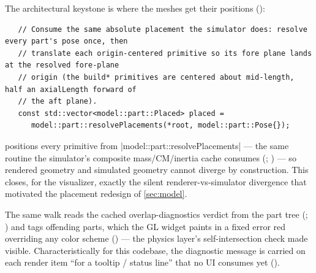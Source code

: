 The architectural keystone is where the meshes get their positions
():

\begin{verbatim}
   // Consume the same absolute placement the simulator does: resolve every part's pose once, then
   // translate each origin-centered primitive so its fore plane lands at the resolved fore-plane
   // origin (the build* primitives are centered about mid-length, half an axialLength forward of
   // the aft plane).
   const std::vector<model::part::Placed> placed =
      model::part::resolvePlacements(*root, model::part::Pose{});
\end{verbatim}

\begin{keyinsight}
 positions every primitive from
\cppinline|model::part::resolvePlacements| --- the same routine the simulator's composite
mass/CM/inertia cache consumes (;
) --- so rendered geometry and simulated geometry cannot diverge by
construction. This closes, for the visualizer, exactly the silent renderer-vs-simulator divergence
that motivated the placement redesign of \cref{sec:model}.
\end{keyinsight}

The same walk reads the cached overlap-diagnostics verdict from the part tree
(; ) and tags offending parts,
which the GL widget paints in a fixed error red overriding any color scheme
() --- the physics layer's self-intersection check made
visible. Characteristically for this codebase, the diagnostic message is carried on each render
item ``for a tooltip / status line'' that no UI consumes yet ().

